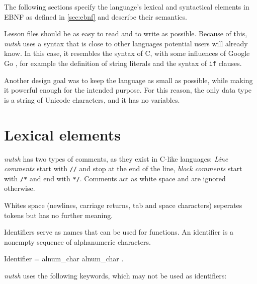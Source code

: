 \documentclass[paper=a4,twoside,abstract=on,cleardoublepage=empty,numbers=noenddot,toc=bib,toc=listof,12pt,appendixprefix=true]{scrreprt}
\begin{document}


The following sections specify the language's lexical and syntactical elements in \textsc{EBNF} as defined in \cref{sec:ebnf} and describe their semantics.

Lesson files should be as easy to read and to write as possible. Because of this, \emph{nutsh} uses a syntax that is close to other languages potential users will already know. In this case, it resembles the syntax of C, with some influences of Google Go \cite{google13}, for example the definition of string literals and the syntax of \texttt{if} clauses.

Another design goal was to keep the language as small as possible, while making it powerful enough for the intended purpose. For this reason, the only data type is a string of Unicode characters, and it has no variables.

\section{Lexical elements}


\emph{nutsh} has two types of comments, as they exist in C-like languages: \emph{Line comments} start with \texttt{//} and stop at the end of the line, \emph{block comments} start with \texttt{/*} and end with \texttt{*/}. Comments act as white space and are ignored otherwise.


Whites space (newlines, carriage returns, tab and space characters) seperates tokens but has no further meaning.


Identifiers serve as names that can be used for functions. An identifier is a nonempty sequence of alphanumeric characters.

\begin{ebnf}
Identifier = alnum_char { alnum_char } .
\end{ebnf}


\emph{nutsh} uses the following keywords, which may not be used as identifiers:
\end{document}

